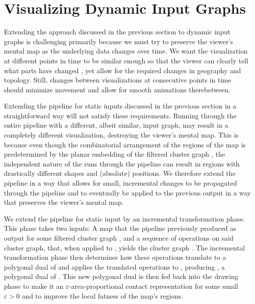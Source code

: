 \chapter{Visualizing Dynamic Input Graphs}
\label{chap:visualizing-dynamic-input-graphs}

Extending the approach discussed in the previous section to dynamic input graphs is challenging primarily because we must try to preserve the viewer's mental map as the underlying data changes over time.
We want the visualization at different points in time to be similar enough so that the viewer can clearly tell what parts have changed \cite{mashima2011visualizing}, yet allow for the required changes in geography and topology.
Still, changes between visualizations at consecutive points in time should minimize movement and allow for smooth animations therebetween.

Extending the pipeline for static inputs discussed in the previous section in a straightforward way will not satisfy these requirements.
Running through the entire pipeline with a different, albeit similar, input graph, may result in a completely different visualization, destroying the viewer's mental map.
This is because even though the combinatorial arrangement of the regions of the map  is predetermined by the planar embedding of the filtered cluster graph , the independent nature of the runs through the pipeline can result in regions with drastically different shapes and (absolute) positions.
We therefore extend the pipeline in a way that allows for small, incremental changes to be propagated through the pipeline and to eventually be applied to the previous output in a way that preserves the viewer's mental map.

We extend the pipeline for static input by an incremental transformation phase.
This phase takes two inputs:
A map  that the pipeline previously produced as output for some filtered cluster graph , and a sequence of operations on said cluster graph, that, when applied to , yields the cluster graph .
The incremental transformation phase then determines how these operations translate to a polygonal dual of  and applies the translated operations to , producing , a polygonal dual of .
This new polygonal dual is then fed back into the drawing phase to make it an $\varepsilon$-area-proportional contact representation  for some small $\varepsilon > 0$ and to improve the local fatness of the map's regions.


